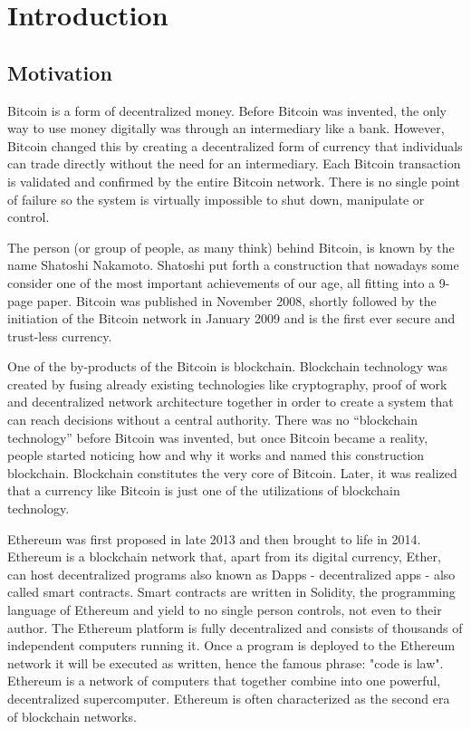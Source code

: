 \chapter{Introduction}

\section{Motivation}

Bitcoin is a form of decentralized money. Before Bitcoin was invented, the only
way to use money digitally was through an intermediary like a bank. However,
Bitcoin changed this by creating a decentralized form of currency that
individuals can trade directly without the need for an intermediary. Each
Bitcoin transaction is validated and confirmed by the entire Bitcoin network.
There is no single point of failure so the system is virtually impossible to
shut down, manipulate or control.

The person (or group of people, as many think) behind Bitcoin, is known by the
name Shatoshi Nakamoto. Shatoshi put forth a construction that nowadays some
consider one of the most important achievements of our age, all fitting into a
9-page paper.  Bitcoin was published in November 2008, shortly followed by the
initiation of the Bitcoin network in January 2009 and is the first ever secure
and trust-less currency.

One of the by-products of the Bitcoin is blockchain. Blockchain technology was
created by fusing already existing technologies like cryptography, proof of
work and decentralized network architecture together in order to create a
system that can reach decisions without a central authority. There was no
“blockchain technology” before Bitcoin was invented, but once Bitcoin became a
reality, people started noticing how and why it works and named this
construction blockchain. Blockchain constitutes the very core of Bitcoin.
Later, it was realized that a currency like Bitcoin is just one of the
utilizations of blockchain technology.

Ethereum was first proposed in late 2013 and then brought to life in 2014.
Ethereum is a blockchain network that, apart from its digital currency, Ether,
can host decentralized programs also known as Dapps - decentralized apps - also
called smart contracts. Smart contracts are written in Solidity, the
programming language of Ethereum and yield to no single person controls, not
even to their author.  The Ethereum platform is fully decentralized and
consists of thousands of independent computers running it. Once a program is
deployed to the Ethereum network it will be executed as written, hence the
famous phrase: "code is law". Ethereum is a network of computers that together
combine into one powerful, decentralized supercomputer. Ethereum is often
characterized as the second era of blockchain networks.

